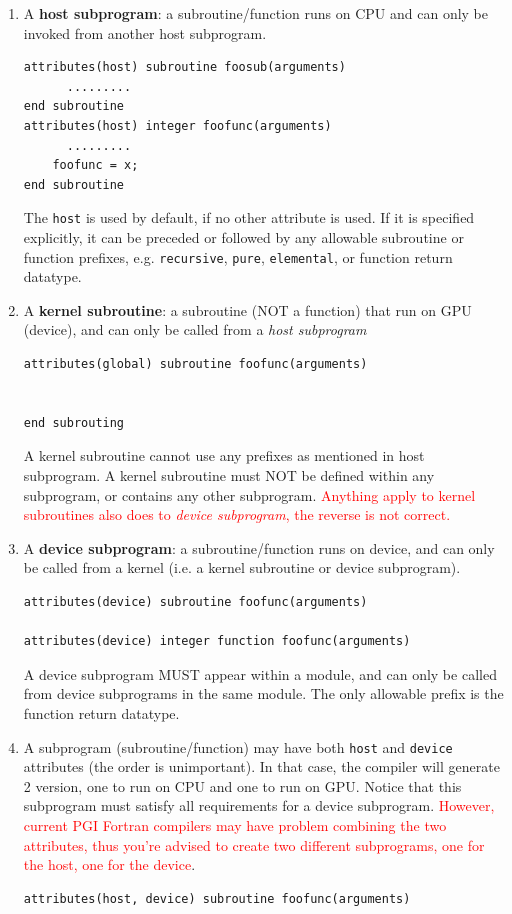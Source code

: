 \begin{enumerate}
\item A {\bf host subprogram}: a subroutine/function runs on CPU and
  can only be invoked from another host subprogram.
\begin{lstlisting}
attributes(host) subroutine foosub(arguments)
      .........
end subroutine
attributes(host) integer foofunc(arguments)
      .........
    foofunc = x;
end subroutine
\end{lstlisting}

  The \verb!host! is used by default, if no other attribute is
  used. If it is specified explicitly, it can be preceded or followed
  by any allowable subroutine or function prefixes,
  e.g. \verb!recursive!, \verb!pure!, \verb!elemental!, or function
  return datatype.

\item A {\bf kernel subroutine}: a subroutine (NOT a function) that
  run on GPU (device), and can only be called from a
  {\it host subprogram}
\begin{lstlisting}
attributes(global) subroutine foofunc(arguments)


end subrouting
\end{lstlisting}
  
  A kernel subroutine cannot use any prefixes as mentioned in host
  subprogram. A kernel subroutine must NOT be defined within any
  subprogram, or contains any other subprogram.
  \textcolor{red}{Anything apply to kernel subroutines also does to
    {\it device subprogram}, the reverse is not correct.}

\item A {\bf device subprogram}: a subroutine/function runs on device,
  and can only be called from a kernel (i.e. a kernel subroutine or
  device subprogram).
\begin{lstlisting}
attributes(device) subroutine foofunc(arguments)

attributes(device) integer function foofunc(arguments)

\end{lstlisting}
  A device subprogram MUST appear within a module, and can only be
  called from device subprograms in the same module. The only
  allowable prefix is the function return datatype.

\item A subprogram (subroutine/function) may have both \verb!host! and
  \verb!device!  attributes (the order is unimportant). In that case,
  the compiler will generate 2 version, one to run on CPU and one to
  run on GPU. Notice that this subprogram must satisfy all
  requirements for a device subprogram.
  \textcolor{red}{However, current PGI Fortran compilers may have
    problem combining the two attributes, thus you're advised to
    create two different subprograms, one for the host, one for the
    device}.
\begin{lstlisting}
attributes(host, device) subroutine foofunc(arguments)



\end{lstlisting}
\end{enumerate}
